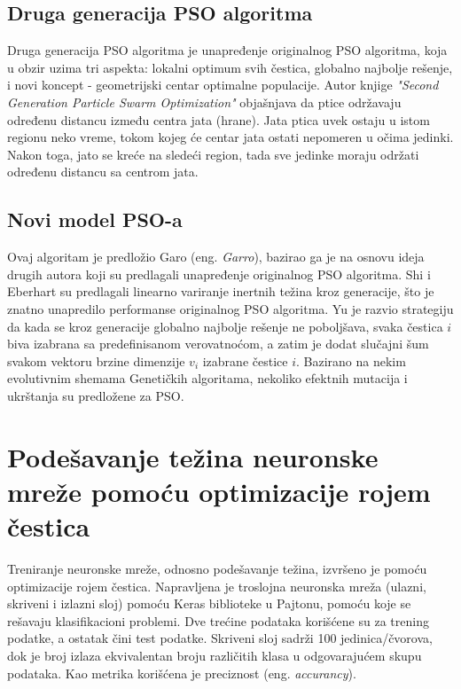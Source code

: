 \documentclass[a4paper]{article}
\begin{document}
{%


\subsection{Druga generacija PSO algoritma}
\label{subsec:sgpso}

Druga generacija PSO algoritma je unapređenje originalnog PSO algoritma, koja u obzir uzima tri aspekta: lokalni optimum svih čestica, globalno najbolje rešenje, i novi koncept - geometrijski centar optimalne populacije. Autor knjige \textit{"{}Second Generation Particle Swarm Optimization"} objašnjava da ptice održavaju  određenu distancu između centra jata (hrane). Jata ptica uvek ostaju u istom regionu neko vreme, tokom kojeg će centar jata ostati nepomeren u očima jedinki. Nakon toga, jato se kreće na sledeći region, tada sve jedinke moraju održati određenu distancu sa centrom jata.

\subsection{Novi model PSO-a}
\label{subsec:nmpso}

Ovaj algoritam je predložio Garo (eng. \textit{Garro}), bazirao ga je na osnovu ideja drugih autora koji su predlagali unapređenje originalnog PSO algoritma. Shi i Eberhart su predlagali linearno variranje inertnih težina kroz generacije, što je znatno unapredilo performanse originalnog PSO algoritma.
Yu je razvio strategiju da kada se kroz generacije globalno najbolje rešenje ne poboljšava, svaka čestica \textit{$i$} biva izabrana sa predefinisanom verovatnoćom, a zatim je dodat slučajni šum svakom vektoru brzine dimenzije $v_i$ izabrane čestice \textit{$i$}. Bazirano na nekim evolutivnim shemama Genetičkih algoritama, nekoliko efektnih mutacija i ukrštanja su predložene za PSO.

\section{Podešavanje težina neuronske mreže pomoću optimizacije rojem čestica}
\label{sec:podesavanjetezina}

Treniranje neuronske mreže, odnosno podešavanje težina, izvršeno je pomoću optimizacije rojem čestica. 
Napravljena je troslojna neuronska mreža (ulazni, skriveni i izlazni sloj) pomoću Keras biblioteke u Pajtonu, pomoću koje se rešavaju klasifikacioni problemi. Dve trećine podataka korišćene su za trening podatke, a ostatak čini test podatke. Skriveni sloj sadrži 100 jedinica/čvorova, dok je broj izlaza ekvivalentan broju različitih klasa u odgovarajućem skupu podataka. Kao metrika korišćena je preciznost (eng. \emph{accurancy}). 

}
\end{document}
